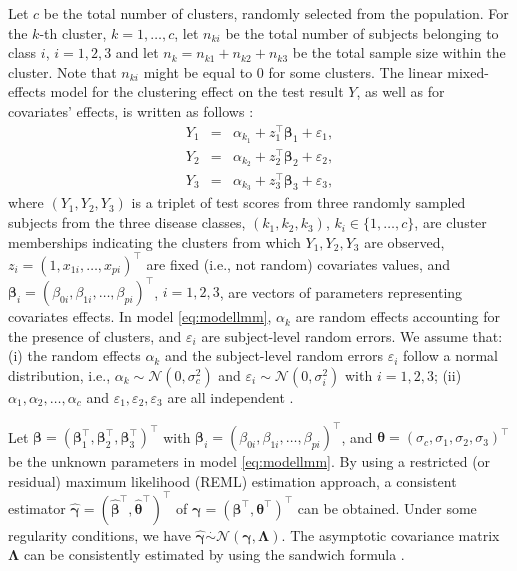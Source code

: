 Let $c$ be the total number of clusters, randomly selected from the population. For the $k$-th cluster, $k=1, \ldots, c$, let $n_{ki}$ be the total number of subjects belonging to class $i$, $i = 1,2,3$ and let $n_k = n_{k1} + n_{k2} + n_{k3}$ be the total sample size within the cluster. Note that $n_{ki}$ might be equal to 0 for some clusters. The linear {mixed-effects} model for the clustering effect on the test result $Y$, as well as for covariates' effects, is written as follows \citep{xiong2018estimating, khanh2022}: 
\begin{eqnarray}
    Y_{1} &=& \alpha_{k_1} + z_1^\top \boldsymbol{\beta}_1 + \varepsilon_{1}, \nonumber \\
    Y_{2} &=& \alpha_{k_2} + z_2^\top  \boldsymbol{\beta}_2 + \varepsilon_{2}, \label{eq:modellmm} \\
    Y_{3} &=& \alpha_{k_3} + z_3^\top \boldsymbol{\beta}_3 + \varepsilon_{3}, \nonumber
\end{eqnarray}
where $(Y_1, Y_2, Y_3)$ is a triplet of test scores from three randomly sampled subjects from the three disease classes, $(k_1, k_2, k_3)$, $k_i \in \{1, \ldots, c\}$, are cluster memberships indicating the clusters from which $Y_1, Y_2, Y_3$ are observed, $z_i = (1, x_{1i}, \ldots, x_{pi})^\top$ are fixed (i.e., not random) covariates values, and $\boldsymbol{\beta}_i = (\beta_{0i}, \beta_{1i}, \ldots, \beta_{pi})^\top$, $i=1,2,3$, are vectors of parameters representing covariates effects. In model \eqref{eq:modellmm}, $\alpha_{k}$ are random effects accounting for the presence of clusters, and $\varepsilon_{i}$ are subject-level random errors. We assume that: (i) the random effects $\alpha_{k}$ and the subject-level random errors  $\varepsilon_{i}$ follow a normal distribution, i.e., $\alpha_{k} \sim \mathcal{N}(0, \sigma^2_c)$ and $\varepsilon_{i} \sim \mathcal{N}(0, \sigma^2_i)$ with $i = 1,2,3$; (ii) $\alpha_{1}, \alpha_{2}, \ldots, \alpha_{c}$ and $\varepsilon_{1}, \varepsilon_{2}, \varepsilon_{3}$ are all independent \citep[see also,][]{mcculloch2004generalized}.

Let $\boldsymbol{\beta} = (\boldsymbol{\beta}_1^\top, \boldsymbol{\beta}_2^\top, \boldsymbol{\beta}_3^\top)^\top$ with $\boldsymbol{\beta}_i = (\beta_{0i}, \beta_{1i}, \ldots, \beta_{pi})^\top$, and $\boldsymbol{\theta} = (\sigma_c, \sigma_1, \sigma_2, \sigma_3)^\top$ be the unknown parameters in model \eqref{eq:modellmm}. By using a restricted (or residual) maximum likelihood (REML) estimation approach, a consistent estimator $\widehat{\boldsymbol{\gamma}} = (\widehat{\boldsymbol{\beta}}^\top, \widehat{\boldsymbol{\theta}}^\top)^\top$ of $\boldsymbol{\gamma} = (\boldsymbol{\beta}^\top, \boldsymbol{\theta}^\top)^\top$ can be obtained. Under some regularity conditions, we have $\widehat{\boldsymbol{\gamma}} \stackrel{.}{\sim} \mathcal{N}(\boldsymbol{\gamma}, \boldsymbol{\Lambda})$. The asymptotic covariance matrix $\boldsymbol{\Lambda}$ can be consistently estimated by using the sandwich formula \citep{liang1986longitudinal, kauermann2001note, mancl2001covariance}.


